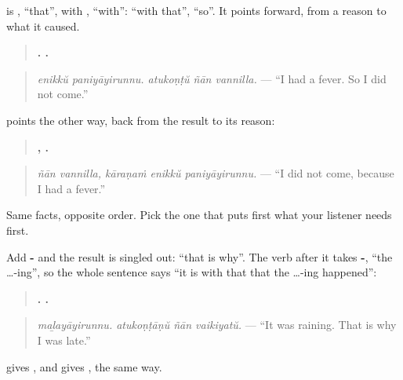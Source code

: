 \begin{grammarlens}[title={Grammar Lens: the reason first, then \ml{അതുകൊണ്ട്}}]
\textbf{} is \textbf{}, \textquotedblleft{}that\textquotedblright{}, with \textbf{}, \textquotedblleft{}with\textquotedblright{}: \textquotedblleft{}with that\textquotedblright{}, \textquotedblleft{}so\textquotedblright{}. It points forward, from a reason to what it caused.

\begin{quote}
\textbf{ .   .}
\end{quote}

\begin{quote}
\emph{enikkŭ paniyāyirunnu. atukoṇṭŭ ñān vannilla.} — \textquotedblleft{}I had a fever. So I did not come.\textquotedblright{}
\end{quote}

\textbf{} points the other way, back from the result to its reason:

\begin{quote}
\textbf{ ,   .}
\end{quote}

\begin{quote}
\emph{ñān vannilla, kāraṇaṁ enikkŭ paniyāyirunnu.} — \textquotedblleft{}I did not come, because I had a fever.\textquotedblright{}
\end{quote}

Same facts, opposite order. Pick the one that puts first what your listener needs first.
\end{grammarlens}

\begin{grammarlens}[title={Grammar Lens: \ml{അതുകൊണ്ടാണ്} — that is why}]
Add \textbf{-} and the result is singled out: \textquotedblleft{}that is why\textquotedblright{}. The verb after it takes \textbf{-}, \textquotedblleft{}the …-ing\textquotedblright{}, so the whole sentence says \textquotedblleft{}it is with that that the …-ing happened\textquotedblright{}:

\begin{quote}
\textbf{.   .}
\end{quote}

\begin{quote}
\emph{maḻayāyirunnu. atukoṇṭāṇŭ ñān vaikiyatŭ.} — \textquotedblleft{}It was raining. That is why I was late.\textquotedblright{}
\end{quote}

\textbf{} gives \textbf{}, and \textbf{} gives \textbf{}, the same way.
\end{grammarlens}

